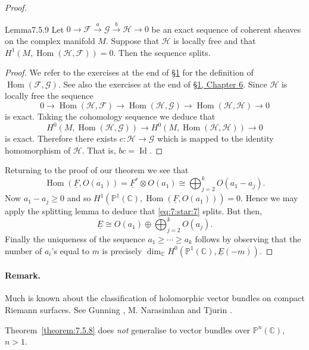 \begin{proof}
\begin{originaltheorem}{Lemma}{7.5.9}
Let $0\to\mathcal{F}\xrightarrow{a}\mathcal{G}\xrightarrow{b}\mathcal{H}\to0$ be an exact sequence of coherent sheaves on the complex manifold $M$. Suppose that $\mathcal{H}$ is locally free and that $H^1(M,\operatorname{Hom}(\mathcal{H},\mathcal{F}))=0$. Then the sequence splits.
\end{originaltheorem}
\begin{proof}
We refer to the exercises at the end of \hyperref[sec:7:1]{\S1} for the definition of $\operatorname{Hom}(\mathcal{F},\mathcal{G})$. See also the exercises at the end of \hyperref[sec:6:1]{\S1, Chapter 6}. Since $\mathcal{H}$ is locally free the sequence
\[
0\to\operatorname{Hom}(\mathcal{H},\mathcal{F})\to\operatorname{Hom}(\mathcal{H},\mathcal{G})\to\operatorname{Hom}(\mathcal{H},\mathcal{H})\to0
\]
is exact. Taking the cohomology sequence we deduce that
\[
H^0(M,\operatorname{Hom}(\mathcal{H},\mathcal{G}))\to H^0(M,\operatorname{Hom}(\mathcal{H},\mathcal{H}))\to0
\]
is exact. Therefore there exists $c:\mathcal{H}\to\mathcal{G}$ which is mapped to the identity homomorphism of $\mathcal{H}$. That is, $bc=\operatorname{Id}$.
\end{proof}

Returning to the proof of our theorem we see that
\[
\operatorname{Hom}(\underline{F},O(a_1))=\underline{F}^*\otimes O(a_1)\cong\bigoplus_{j=2}^k O(a_1-a_j).
\]
Now $a_1-a_j\geq0$ and so $H^1(\mathbb{P}^1(\mathbb{C}),\operatorname{Hom}(\underline{F},O(a_1)))=0$. Hence we may apply the splitting lemma to deduce that \eqref{eq:7:star:7} splits. But then,
\[
\underline{E}\cong O(a_1)\oplus\bigoplus_{j=2}^k O(a_j).
\]
Finally the uniqueness of the sequence $a_1\geq\cdots\geq a_k$ follows by observing that the number of $a_i$'s equal to $m$ is precisely $\dim_{\mathbb{C}}H^0(\mathbb{P}^1(\mathbb{C}),\underline{E}(-m))$.
\end{proof}
\paragraph{Remark.} Much is known about the classification of holomorphic vector bundles on compact Riemann surfaces. See Gunning \cite{bib:II:gunning-r-c:3}, M. Narasimhan \cite{bib:II:narasimhan-m:1} and Tjurin \cite{bib:II:tyurin-a-n:1}.

Theorem~\ref{theorem:7.5.8} does \emph{not} generalise to vector bundles over $\mathbb{P}^n(\mathbb{C})$, $n>1$.

